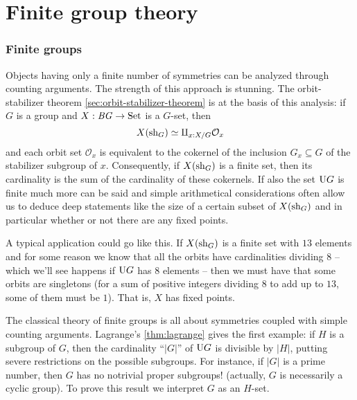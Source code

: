 \chapter{Finite group theory}
\label{ch:fingp}

\subsection{Finite groups}
\label{sec:fingp}
\newcommand{\gporder}{cardinality\xspace}
\newcommand{\gporders}{cardinalities\xspace}
Objects having only a finite number of symmetries can be analyzed through counting arguments.  The strength of this approach is stunning.  The orbit-stabilizer theorem \cref{sec:orbit-stabilizer-theorem} is at the basis of this analysis: if $G$ is a group and $X:\mathit{B}\mathit{G}\to\mathrm{Set}$ is a $G$-set, then
$$X(\mathrm{sh}_G)\simeq \amalg_{x:X/G}\mathcal O_x$$
and each orbit set $\mathcal O_x$ is equivalent to the cokernel of the inclusion $G_x\subseteq G$ of the stabilizer subgroup of $x$.
Consequently, if $X(\mathrm{sh}_G)$ is a finite set, then its cardinality is the sum of the cardinality of these cokernels.  If also the set $\mathrm{U} G$ is finite much more can be said and simple arithmetical considerations often allow us to deduce deep statements like the size of a certain subset of $X(\mathrm{sh}_G)$ and in particular whether or not there are any fixed points.

\begin{example}
  A typical application could go like this.  
If $X(\mathrm{sh}_G)$ is a finite set with $13$ elements and for some reason we know that all the orbits have cardinalities dividing $8$ -- which we'll see happens if $\mathrm{U} G$ has $8$ elements -- then we must have that some orbits are singletons (for a sum of positive integers dividing $8$ to add up to $13$, some of them must be $1$).
That is, $X$ has fixed points.
\end{example}

The classical theory of finite groups is all about symmetries coupled with simple counting arguments. 
Lagrange's \cref{thm:lagrange} gives the first example: if $H$ is a subgroup of $G$, then the cardinality ``$|G|$'' of $\mathrm{U} G$ is divisible by $|H|$, putting severe restrictions on the possible subgroups.  For instance, if $|G|$ is a prime number, then $G$ has no notrivial proper subgroups! (actually, $G$ is necessarily a cyclic group).  To prove this result we interpret $G$ as an $H$-set.



